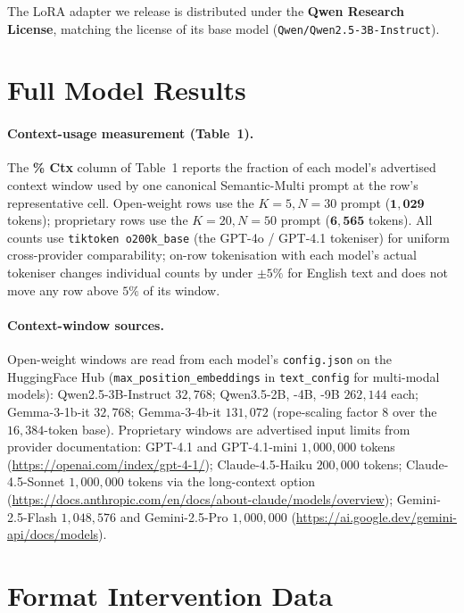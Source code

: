 \documentclass[letterpaper]{article} %
\begin{document}
The LoRA adapter we release is distributed under the
\textbf{Qwen Research License}, matching the license of its base
model (\texttt{Qwen/Qwen2.5-3B-Instruct}).

\section{Full Model Results}
\label{app:full_results}

\paragraph{Context-usage measurement (Table~1).}
The \textbf{\% Ctx} column of Table~1 reports the
fraction of each model's advertised context window used by one
canonical Semantic-Multi prompt at the row's representative cell.
Open-weight rows use the $K{=}5, N{=}30$ prompt
($\mathbf{1{,}029}$ tokens); proprietary rows use the $K{=}20, N{=}50$
prompt ($\mathbf{6{,}565}$ tokens). All counts use
\texttt{tiktoken o200k\_base} (the GPT-4o / GPT-4.1 tokeniser) for
uniform cross-provider comparability; on-row tokenisation with each
model's actual tokeniser changes individual counts by under
$\pm 5\%$ for English text and does not move any row above $5\%$ of
its window.

\paragraph{Context-window sources.}
Open-weight windows are read from each model's
\texttt{config.json} on the HuggingFace Hub
(\texttt{max\_position\_embeddings} in
\texttt{text\_config} for multi-modal models):
Qwen2.5-3B-Instruct $32{,}768$;
Qwen3.5-2B, -4B, -9B $262{,}144$ each;
Gemma-3-1b-it $32{,}768$;
Gemma-3-4b-it $131{,}072$ (rope-scaling factor 8 over the
$16{,}384$-token base).
Proprietary windows are advertised input limits from provider
documentation:
GPT-4.1 and GPT-4.1-mini $1{,}000{,}000$ tokens
(\url{https://openai.com/index/gpt-4-1/});
Claude-4.5-Haiku $200{,}000$ tokens; Claude-4.5-Sonnet $1{,}000{,}000$
tokens via the long-context option
(\url{https://docs.anthropic.com/en/docs/about-claude/models/overview});
Gemini-2.5-Flash $1{,}048{,}576$ and Gemini-2.5-Pro $1{,}000{,}000$
(\url{https://ai.google.dev/gemini-api/docs/models}).

\section{Format Intervention Data}
\label{app:formats}
\end{document}
